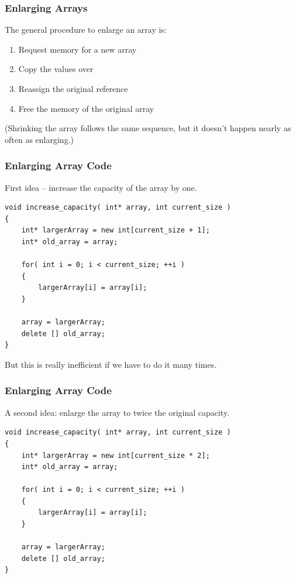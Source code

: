 \begin{frame}
\frametitle{Enlarging Arrays}
The general procedure to enlarge an array is:

\begin{enumerate}
	\item Request memory for a new array
 	\item Copy the values over
	\item Reassign the original reference
	\item Free the memory of the original array
\end{enumerate}

(Shrinking the array follows the same sequence, but it doesn't happen nearly as often as enlarging.)

\end{frame}

\begin{frame}[fragile]
\frametitle{Enlarging Array Code}

First idea -- increase the capacity of the array by one.

\begin{verbatim}
void increase_capacity( int* array, int current_size )
{
    int* largerArray = new int[current_size + 1];
    int* old_array = array;
    
    for( int i = 0; i < current_size; ++i )
    {
        largerArray[i] = array[i];
    }
    
    array = largerArray;
    delete [] old_array;
}
\end{verbatim}

But this is really inefficient if we have to do it many times.

\end{frame}


\begin{frame}[fragile]
\frametitle{Enlarging Array Code}

A second idea: enlarge the array to twice the original capacity.

\begin{verbatim}
void increase_capacity( int* array, int current_size )
{
    int* largerArray = new int[current_size * 2];
    int* old_array = array;
    
    for( int i = 0; i < current_size; ++i )
    {
        largerArray[i] = array[i];
    }
    
    array = largerArray;
    delete [] old_array;
}
\end{verbatim}

\end{frame}



